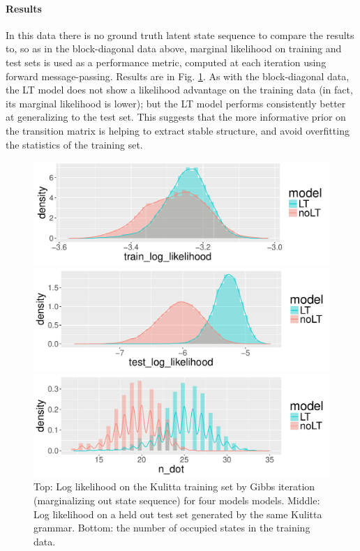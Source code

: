 \paragraph{Results}
In this data there is no ground truth latent state sequence to compare
the results to, so as in the block-diagonal data above, marginal
likelihood on training and test sets is used as a performance metric,
computed at each iteration using forward message-passing.  Results are
in Fig. \ref{fig:music-likelihoods}.  As with the block-diagonal data,
the LT model does not show a likelihood advantage on the training data
(in fact, its marginal likelihood is lower); but the LT model performs 
consistently better at generalizing to the test set.  This suggests
that the more informative prior on the transition matrix 
is helping to extract stable structure, and avoid overfitting the
statistics of the training set.

\begin{figure}[tb]
\begin{center}
  \centerline{\includegraphics[width = 0.75\columnwidth]{fig/music/chord1/train_log_likelihood_density.pdf}}
  \centerline{\includegraphics[width = 0.75\columnwidth]{fig/music/chord1/test_log_likelihood_density.pdf}}
  \centerline{\includegraphics[width = 0.75\columnwidth]{fig/music/chord1/n_dot_density.pdf}}
\caption{Top: Log likelihood on the Kulitta training set by Gibbs iteration
  (marginalizing out state sequence) for four models
  models.  Middle: Log likelihood on a held out test set generated by
  the same Kulitta grammar.  Bottom: the number of occupied
  states in the training data. \label{fig:music-likelihoods}}
\end{center}
\end{figure}


